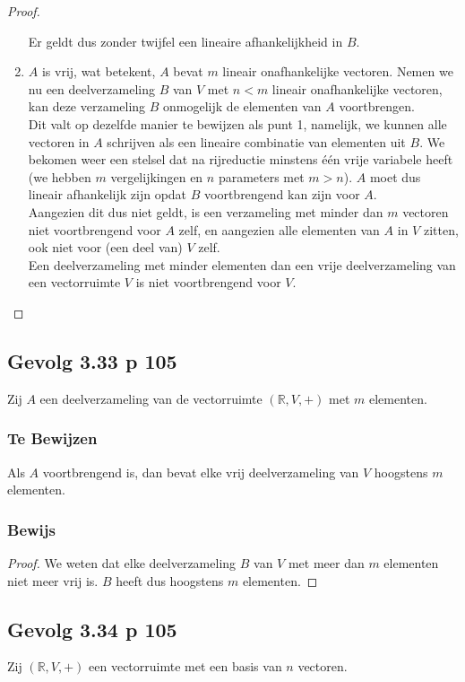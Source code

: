 \documentclass[lineaire_algebra_oplossingen.tex]{subfiles}
\begin{document}
\begin{proof}
\begin{enumerate}
Er geldt dus zonder twijfel een lineaire afhankelijkheid in $B$.
\item
$A$ is vrij, wat betekent, $A$ bevat $m$ lineair onafhankelijke vectoren. Nemen we nu een deelverzameling $B$ van $V$ met $n<m$ lineair onafhankelijke vectoren, kan deze verzameling $B$ onmogelijk de elementen van $A$ voortbrengen.\\
Dit valt op dezelfde manier te bewijzen als punt 1, namelijk, we kunnen alle vectoren in $A$ schrijven als een lineaire combinatie van elementen uit $B$. We bekomen weer een stelsel dat na rijreductie minstens \'e\'en vrije variabele heeft (we hebben $m$ vergelijkingen en $n$ parameters met $m>n$). $A$ moet dus lineair afhankelijk zijn opdat $B$ voortbrengend kan zijn voor $A$.\\ Aangezien dit dus niet geldt, is een verzameling met minder dan $m$ vectoren niet voortbrengend voor $A$ zelf, en aangezien alle elementen van $A$ in $V$ zitten, ook niet voor (een deel van) $V$ zelf.\\
Een deelverzameling met minder elementen dan een vrije deelverzameling van een vectorruimte $V$ is niet voortbrengend voor $V$.
\end{enumerate}
\end{proof}


\subsection{Gevolg 3.33 p 105}
\label{3.33}
Zij $A$ een deelverzameling van de vectorruimte $(\mathbb{R},V,+)$ met $m$ elementen.

\subsubsection*{Te Bewijzen}
Als $A$ voortbrengend is, dan bevat elke vrij deelverzameling van $V$ hoogstens $m$ elementen.

\subsubsection*{Bewijs}
\begin{proof}
We weten dat elke deelverzameling $B$ van $V$ met meer dan $m$ elementen niet meer vrij is. $B$ heeft dus hoogstens $m$ elementen.
\end{proof}


\subsection{Gevolg 3.34 p 105}
\label{3.34}
Zij $(\mathbb{R},V,+)$ een vectorruimte met een basis van $n$ vectoren.
\end{document}
